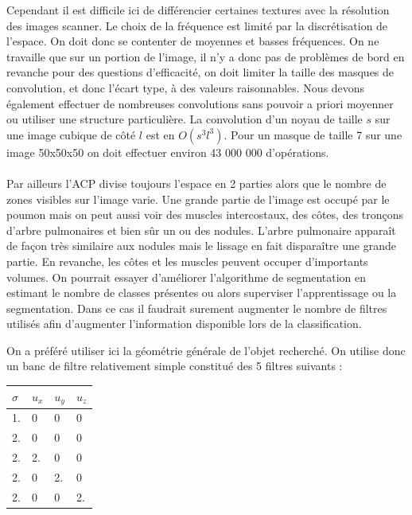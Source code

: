 \documentclass{article}
\begin{document}
Cependant il est difficile ici de différencier certaines textures avec la résolution des images scanner. Le choix de la fréquence est limité par la discrétisation de l'espace. On doit donc se contenter de moyennes et basses fréquences. On ne travaille que sur un portion de l'image, il n'y a donc pas de problèmes de bord en revanche pour des questions d'efficacité, on doit limiter la taille des masques de convolution, et donc l'écart type, à des valeurs raisonnables. Nous devons également effectuer de nombreuses convolutions sans pouvoir a priori moyenner ou utiliser une structure particulière. La convolution d'un noyau de taille $s$ sur une image cubique de côté $l$ est en $O(s^3 l^3)$. Pour un masque de taille 7 sur une image 50x50x50 on doit effectuer environ 43 000 000 d'opérations. 
\\\\

Par ailleurs l'ACP divise toujours l'espace en 2 parties alors que le nombre de zones visibles sur l'image varie. Une grande partie de l'image est occupé par le poumon mais on peut aussi voir des muscles intercostaux, des côtes, des tronçons d'arbre pulmonaires et bien sûr un ou des nodules.
L'arbre pulmonaire apparaît de façon très similaire aux nodules mais le lissage en fait disparaître une grande partie.
En revanche, les côtes et les muscles peuvent occuper d'importants volumes. On pourrait essayer d'améliorer l'algorithme de segmentation en estimant le nombre de classes présentes ou alors superviser l'apprentissage ou la segmentation. Dans ce cas il faudrait surement augmenter le nombre de filtres utilisés afin d'augmenter l'information disponible lors de la classification.

On a préféré utiliser ici la géométrie générale de l'objet recherché.
On utilise donc un banc de filtre relativement simple constitué des 5 filtres suivants :
\begin{center}
\begin{tabular}{|llll|}
  \hline
   $\sigma$  & $u_x$ & $u_y $ & $u_z$ \\
  \hline
   1. & 0   & 0  & 0   \\
   2. & 0   & 0  & 0   \\
   2. & 2.  & 0  & 0   \\
   2. & 0  & 2.  & 0   \\
   2. & 0   & 0  & 2.  \\
  \hline
\end{tabular}
\end{center}
\end{document}
